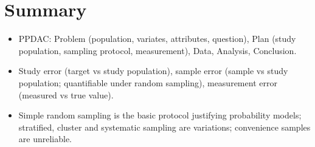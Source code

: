 \section*{Summary}
\begin{itemize}
  \item PPDAC: Problem (population, variates, attributes, question), Plan (study
        population, sampling protocol, measurement), Data, Analysis, Conclusion.
  \item Study error (target vs study population), sample error (sample vs study
        population; quantifiable under random sampling), measurement error (measured vs
        true value).
  \item Simple random sampling is the basic protocol justifying probability models;
        stratified, cluster and systematic sampling are variations; convenience samples
        are unreliable.
\end{itemize}
